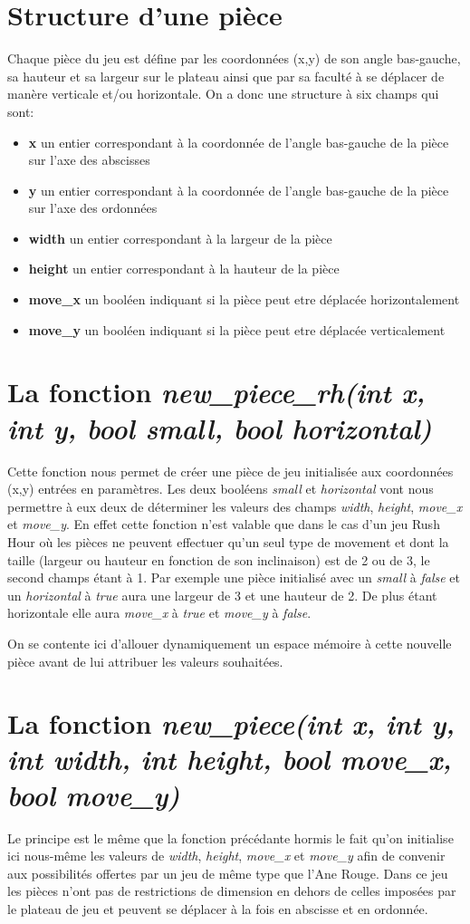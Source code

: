 \documentclass{report}
\begin{document}
\section*{Structure d'une pièce}
Chaque pièce du jeu est défine par les coordonnées (x,y) de son angle bas-gauche, sa hauteur et sa largeur sur le plateau ainsi que par sa faculté à se déplacer de manère verticale et/ou horizontale.
On a donc une structure à six champs qui sont:
\begin{itemize}
\item \textbf{x} un entier correspondant à la coordonnée de l'angle bas-gauche de la pièce sur l'axe des abscisses
\item \textbf{y} un entier correspondant à la coordonnée de l'angle bas-gauche de la pièce sur l'axe des ordonnées
\item \textbf{width} un entier correspondant à la largeur de la pièce
\item \textbf{height} un entier correspondant à la hauteur de la pièce
\item \textbf{move\_x} un booléen indiquant si la pièce peut etre déplacée horizontalement
\item \textbf{move\_y} un booléen indiquant si la pièce peut etre déplacée verticalement
\end{itemize} 
\section*{La fonction \textit{new\_piece\_rh(int x, int y, bool small, bool horizontal)}}
Cette fonction nous permet de créer une pièce de jeu initialisée aux coordonnées (x,y) entrées en paramètres. Les deux booléens \textit{small} et \textit{horizontal} vont nous permettre à eux deux de déterminer les valeurs des champs \textit{width}, \textit{height}, \textit{move\_x} et \textit{move\_y}. En effet cette fonction n'est valable que dans le cas d'un jeu Rush Hour où les pièces ne peuvent effectuer qu'un seul type de movement et dont la taille (largeur ou hauteur en fonction de son inclinaison) est de 2 ou de 3, le second champs étant à 1. Par exemple une pièce initialisé avec un \textit{small} à \textit{false} et un \textit{horizontal} à \textit{true} aura une largeur de 3 et une hauteur de 2. De plus étant horizontale elle aura \textit{move\_x} à \textit{true} et \textit{move\_y} à \textit{false}.

On se contente ici d'allouer dynamiquement un espace mémoire à cette nouvelle pièce avant de lui attribuer les valeurs souhaitées.
\section*{La fonction \textit{new\_piece(int x, int y, int width, int height, bool move\_x, bool move\_y)}}
Le principe est le même que la fonction précédante hormis le fait qu'on initialise ici nous-même les valeurs de \textit{width}, \textit{height}, \textit{move\_x} et \textit{move\_y} afin de convenir aux possibilités offertes par un jeu de même type que l'Ane Rouge. Dans ce jeu les pièces n'ont pas de restrictions de dimension en dehors de celles imposées par le plateau de jeu et peuvent se déplacer à la fois en abscisse et en ordonnée.
\end{document}
